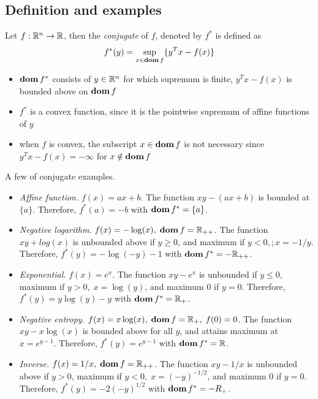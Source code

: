\subsection{Definition and examples}
Let $f:\mathbb{R}^n\rightarrow\mathbb{R}$, then the \textit{conjugate} of $f$, denoted by $f^\ast$ is defined as
\begin{align}
  f^\ast(y)=\sup_{x\in\mathop{\bf dom} f}\{y^Tx-f(x)\}\label{eq:3.18}
\end{align}
\begin{itemize}
  \item $\mathop{\bf dom} f^\ast$ consists of $y\in\mathbb{R}^n$ for which supremum is finite, \ie $y^Tx-f(x)$ is bounded above on $\mathop{\bf dom} f$
  \item $f^\ast$ is a convex function, since it is the pointwise supremum of affine functions of $y$
  \item when $f$ is convex, the subscript $x\in\mathop{\bf dom} f$ is not necessary since $y^Tx-f(x)=-\infty$ for $x\notin\mathop{\bf dom} f$
\end{itemize}
\begin{example}
  A few of conjugate examples.
  \begin{itemize}
    \item \textit{Affine function.}
          $f(x)=ax+b$.
          The function $xy-(ax+b)$ is bounded at $\{a\}$.
          Therefore, $f^\ast(a)=-b$ with $\mathop{\bf dom} f^\ast=\{a\}$.
    \item \textit{Negative logarithm.}
          $f(x)=-\log(x),\;\mathop{\bf dom} f=\mathbb{R}_{++}$.
          The function $xy+log(x)$ is unbounded above if $y\ge 0$, and maximum if $y<0,;x=-1/y$.
          Therefore, $f^\ast(y)=-\log(-y)-1$ with $\mathop{\bf dom} f^\ast=-\mathbb{R}_{++}$.
    \item \textit{Exponential.}
          $f(x)=e^x$.
          The function $xy-e^x$ is unbounded if $y\le 0$, maximum if $y>0,\;x=\log(y)$, and maximum $0$ if $y=0$.
          Therefore, $f^\ast(y)=y\log(y)-y$ with $\mathop{\bf dom} f^\ast=\mathbb{R}_{+}$.
    \item \textit{Negative entropy.}
          $f(x)=x\log(x),\;\mathop{\bf dom} f=\mathbb{R}_{+},\;f(0)=0$.
          The function $xy-x\log(x)$ is bounded above for all $y$, and attains maximum at $x=e^{y-1}$.
          Therefore, $f^\ast(y)=e^{y-1}$ with $\mathop{\bf dom} f^\ast=\mathbb{R}$.
    \item \textit{Inverse.}
          $f(x)=1/x,\;\mathop{\bf dom} f=\mathbb{R}_{++}$.
          The function $xy-1/x$ is unbounded above if $y>0$, maximum if $y<0,\;x=(-y)^{-1/2}$, and maximum $0$ if $y=0$.
          Therefore, $f^\ast(y)=-2(-y)^{1/2}$ with $\mathop{\bf dom} f^\ast=-R_{+}$.
  \end{itemize}
\end{example}
